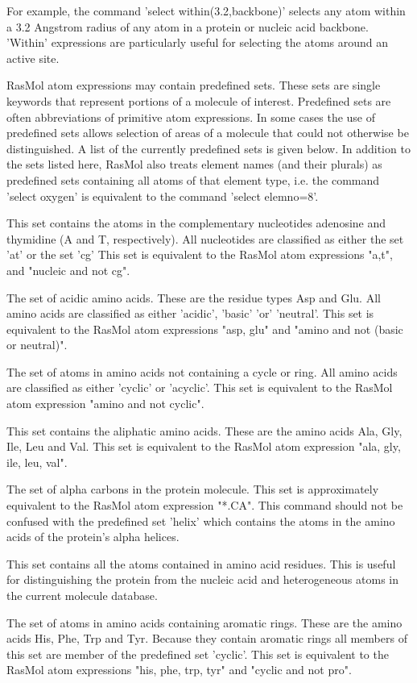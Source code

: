 For example, the command
'select within(3.2,backbone)'
selects any atom within a 3.2 Angstrom radius of any atom in a
protein or nucleic acid backbone.
'Within'
expressions are particularly useful for selecting the atoms
around an active site.

RasMol atom expressions may contain predefined sets. These sets
are single keywords that represent portions of a molecule of interest.
Predefined sets are often abbreviations of primitive atom expressions.
In some cases the use of predefined sets allows selection of areas of
a molecule that could not otherwise be distinguished.
A list of the currently predefined sets
is given below.
In addition to the sets listed here, RasMol also treats element names
(and their plurals) as predefined sets containing all atoms of that
element type, i.e. the command
'select oxygen'
is equivalent to the command
'select elemno=8'.

This set contains the atoms in the complementary nucleotides
adenosine and thymidine (A and T, respectively). All nucleotides
are classified as either the set
'at'
or the set
'cg'
This set is equivalent to the RasMol atom expressions
"a,t",
and
"nucleic and not cg".

The set of acidic amino acids.
These are the residue types Asp and Glu.
All amino acids are classified as either
'acidic',
'basic'
'or'
'neutral'.
This set is equivalent to the RasMol atom expressions
"asp, glu"
and
"amino and not (basic or neutral)".

The set of atoms in amino acids not containing a cycle or
ring. All amino acids are classified as either
'cyclic'
or
'acyclic'.
This set is equivalent to the RasMol atom expression
"amino and not cyclic".

This set contains the aliphatic amino acids.
These are the amino acids Ala, Gly, Ile, Leu and Val.
This set is equivalent to the RasMol atom expression
"ala, gly, ile, leu, val".

The set of alpha carbons in the protein molecule. This set is
approximately equivalent to the RasMol atom expression
"*.CA".
This command should not be confused with the predefined set
'helix'
which contains the atoms in the amino acids of the protein's
alpha helices.

This set contains all the atoms contained in amino acid residues.
This is useful for distinguishing the protein from the nucleic
acid and heterogeneous atoms in the current molecule database.

The set of atoms in amino acids containing aromatic rings.
These are the amino acids His, Phe, Trp and Tyr.
Because they contain aromatic rings all members of this
set are member of the predefined set
'cyclic'.
This set is equivalent to the RasMol atom expressions
"his, phe, trp, tyr"
and
"cyclic and not pro".


